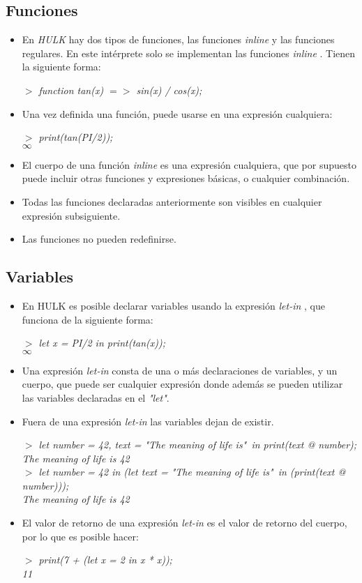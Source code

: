 \documentclass[12pt]{article}
\newcommand{\hulk}{\emph{HULK} }
\newcommand{\ini}{$>$ }
\newcommand{\inline}{\textit{inline} }
\newcommand{\letin}{\textit{let-in} }
\begin{document}
\subsection*{Funciones}
\begin{itemize}
	\item En \hulk hay dos tipos de funciones, las funciones \inline y las funciones regulares. En este intérprete solo se implementan las funciones \inline.
	Tienen la siguiente forma:
	
	\emph{\ini function tan(x) $=>$ sin(x) / cos(x);}
	
	\item Una vez definida una función, puede usarse en una expresión cualquiera:
	
	\emph{
	\ini print(tan(PI/2)); \\
	$\infty$
	}
	\item El cuerpo de una función \inline es una expresión cualquiera, que por supuesto puede incluir otras funciones y expresiones básicas, o cualquier combinación.
	\item Todas las funciones declaradas anteriormente son visibles en cualquier expresión subsiguiente.
	\item Las funciones no pueden redefinirse.
\end{itemize}
	
\subsection*{Variables}
\begin{itemize}
	\item En HULK es posible declarar variables usando la expresión \letin, que funciona de la siguiente forma:
	
	\emph{
	\ini let x = PI/2 in print(tan(x)); \\
	$\infty$	
	}
	\item Una expresión \letin consta de una o más declaraciones de variables, y un cuerpo, que puede ser cualquier expresión donde además se pueden utilizar las variables declaradas en el \textit{"let"}.
	\item Fuera de una expresión \letin las variables dejan de existir.
	
	\emph{
	\ini let number = 42, text = "The meaning of life is"\ in print(text @ number); \\
	The meaning of life is 42 \\
	\ini let number = 42 in (let text = "The meaning of life is"\ in (print(text @ number))); \\
	The meaning of life is 42
	}
	\item El valor de retorno de una expresión \letin es el valor de retorno del cuerpo, por lo que es posible hacer:
	
	\emph{
	\ini print(7 + (let x = 2 in x * x)); \\
	11
	}
\end{itemize}
	
\end{document}
